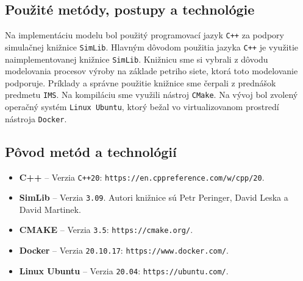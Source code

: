 \documentclass[a4paper, 10pt]{article}
\begin{document}
    \subsection{Použité metódy, postupy a technológie}
    Na implementáciu modelu bol použitý programovací jazyk \texttt{C++} za podpory simulačnej knižnice \texttt{SimLib}.
    Hlavným dôvodom použitia jazyka \texttt{C++} je využitie naimplementovanej
    knižnice \texttt{SimLib}. Knižnicu sme si vybrali z dôvodu modelovania procesov výroby na základe petriho siete, ktorá
    toto modelovanie podporuje. Príklady a správne použitie knižnice sme čerpali z prednášok predmetu \texttt{IMS}\cite{IMS_slides}.
    Na kompiláciu sme využili nástroj \texttt{CMake}. Na vývoj bol zvolený operačný systém
    \texttt{Linux Ubuntu}, ktorý bežal vo virtualizovanom prostredí nástroja \texttt{Docker}.

    \subsection{Pôvod metód a technológií}
    \begin{itemize}
        \item \textbf{C++} -- Verzia \texttt{C++20}: \texttt{https://en.cppreference.com/w/cpp/20}.
        \item \textbf{SimLib} -- Verzia \texttt{3.09}\cite{simblib}. Autori knižnice sú Petr Peringer,
        David Leska a David Martinek.
        \item \textbf{CMAKE} -- Verzia \texttt{3.5}: \texttt{https://cmake.org/}.
        \item \textbf{Docker} -- Verzia \texttt{20.10.17}: \texttt{https://www.docker.com/}.
        \item \textbf{Linux Ubuntu} -- Verzia \texttt{20.04}: \texttt{https://ubuntu.com/}.
    \end{itemize}


\end{document}
